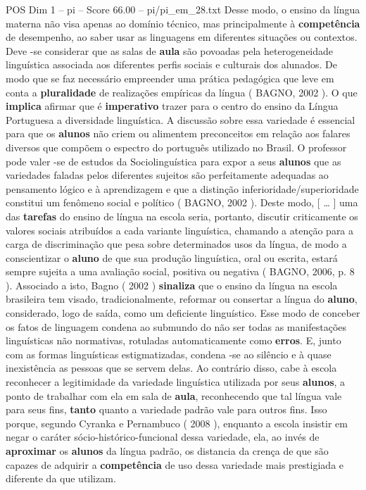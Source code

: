 \begin{textsample}{POS Dim 1 – pi – Score 66.00 – pi/pi\_em\_28.txt}
Desse modo, o ensino da língua materna não visa apenas ao domínio técnico, mas principalmente à \textbf{competência} de desempenho, ao saber usar as linguagens em diferentes situações ou contextos.
Deve -se considerar que as salas de \textbf{aula} são povoadas pela heterogeneidade linguística associada aos diferentes perfis sociais e culturais dos alunados.
De modo que se faz necessário empreender uma prática pedagógica que leve em conta a \textbf{pluralidade} de realizações empíricas da língua ( BAGNO, 2002 ).
O que \textbf{implica} afirmar que é \textbf{imperativo} trazer para o centro do ensino da Língua Portuguesa a diversidade linguística.
A discussão sobre essa variedade é essencial para que os \textbf{alunos} não criem ou alimentem preconceitos em relação aos falares diversos que compõem o espectro do português utilizado no Brasil.
O professor pode valer -se de estudos da Sociolinguística para expor a seus \textbf{alunos} que as variedades faladas pelos diferentes sujeitos são perfeitamente adequadas ao pensamento lógico e à aprendizagem e que a distinção inferioridade/superioridade constitui um fenômeno social e político ( BAGNO, 2002 ).
Deste modo, [ … ] uma das \textbf{tarefas} do ensino de língua na escola seria, portanto, discutir criticamente os valores sociais atribuídos a cada variante linguística, chamando a atenção para a carga de discriminação que pesa sobre determinados usos da língua, de modo a conscientizar o \textbf{aluno} de que sua produção linguística, oral ou escrita, estará sempre sujeita a uma avaliação social, positiva ou negativa ( BAGNO, 2006, p. 8 ).
Associado a isto, Bagno ( 2002 ) \textbf{sinaliza} que o ensino da língua na escola brasileira tem visado, tradicionalmente, reformar ou consertar a língua do \textbf{aluno}, considerado, logo de saída, como um deficiente linguístico.
Esse modo de conceber os fatos de linguagem condena ao submundo do não ser todas as manifestações linguísticas não normativas, rotuladas automaticamente como \textbf{erros}.
E, junto com as formas linguísticas estigmatizadas, condena -se ao silêncio e à quase inexistência as pessoas que se servem delas.
Ao contrário disso, cabe à escola reconhecer a legitimidade da variedade linguística utilizada por seus \textbf{alunos}, a ponto de trabalhar com ela em sala de \textbf{aula}, reconhecendo que tal língua vale para seus fins, \textbf{tanto} quanto a variedade padrão vale para outros fins.
Isso porque, segundo Cyranka e Pernambuco ( 2008 ), enquanto a escola insistir em negar o caráter sócio-histórico-funcional dessa variedade, ela, ao invés de \textbf{aproximar} os \textbf{alunos} da língua padrão, os distancia da crença de que são capazes de adquirir a \textbf{competência} de uso dessa variedade mais prestigiada e diferente da que utilizam.

\end{textsample}
